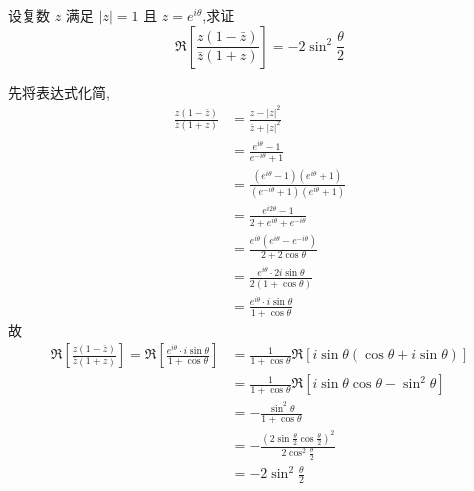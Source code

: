 \begin{questions}

    \question 设复数 $z$ 满足 $|z|=1$ 且 $z = e^{i\theta}$,求证
    \[
    \Re \left[ \frac{z(1-\bar{z})}{\bar{z}(1+z)} \right]=-2 \sin^2 \frac{\theta}{2}
    \]
    \begin{solution}
        先将表达式化简,
        \begin{align*}
        \frac{z(1-\bar{z})}{\bar{z}(1+z)} 
        &= \frac{z - |z|^2}{\bar{z} + |z|^2}  \\
        &= \frac{e^{i\theta} - 1}{e^{-i\theta} + 1} \\
        &=  \frac{(e^{i\theta}-1)(e^{i\theta}+1)}{(e^{-i\theta}+1)(e^{i\theta}+1)}  \\
        &=  \frac{e^{i2\theta}-1}{2 + e^{i\theta}+e^{-i\theta}} \\
        &=  \frac{e^{i\theta} (e^{i\theta}-e^{-i\theta})}{2 + 2\cos\theta}  \\
        &=  \frac{e^{i\theta} \cdot 2i\sin\theta}{2(1+\cos\theta)} \\
        &=  \frac{e^{i\theta} \cdot i\sin\theta}{1+\cos\theta} 
        \end{align*}
        故
        \begin{align*}
        \Re \left[ \frac{z(1-\bar{z})}{\bar{z}(1+z)} \right]=\Re \left[ \frac{e^{i\theta} \cdot i\sin\theta}{1+\cos\theta} \right] &= \frac{1}{1+\cos\theta} \Re \left[ i \sin\theta (\cos\theta + i\sin\theta) \right] \\
        &= \frac{1}{1+\cos\theta} \Re \left[ i \sin\theta \cos\theta - \sin^2\theta \right] \\
        &= -\frac{\sin^2\theta}{1+\cos\theta} \\
        &= -\frac{(2\sin\frac{\theta}{2}\cos\frac{\theta}{2})^2}{2\cos^2\frac{\theta}{2}} \\
        &= -2 \sin^2 \frac{\theta}{2}
        \end{align*}
    \end{solution}
    

\end{questions}
